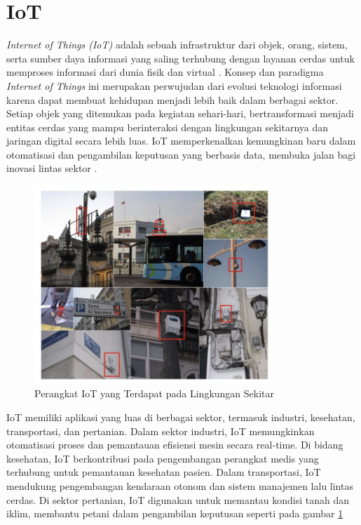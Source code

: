 \section{IoT}



\textit{Internet of Things (IoT)} adalah sebuah infrastruktur dari objek, orang, sistem, serta sumber daya informasi yang saling terhubung dengan layanan cerdas untuk memproses informasi dari dunia fisik dan virtual \parencite{Dias2019}. Konsep dan paradigma \textit{Internet of Things} ini merupakan perwujudan dari evolusi teknologi informasi karena dapat membuat kehidupan menjadi lebih baik dalam berbagai sektor. Setiap objek yang ditemukan pada kegiatan sehari-hari, bertransformasi menjadi entitas cerdas yang mampu berinteraksi dengan lingkungan sekitarnya dan jaringan digital secara lebih luas. IoT memperkenalkan kemungkinan baru dalam otomatisasi dan pengambilan keputusan yang berbasis data, membuka jalan bagi inovasi lintas sektor \parencite{madakam2015internet}.

\begin{figure}[ht]
  \centering
  \includegraphics[width=0.8\textwidth]{resources/chapter-2/gambar-iot.jpg}
  \caption{Perangkat IoT yang Terdapat pada Lingkungan Sekitar \parencite{sotres2017practical}}
  \label{fig:iot-kehidupan-sehari-hari}
\end{figure}

IoT memiliki aplikasi yang luas di berbagai sektor, termasuk industri, kesehatan, transportasi, dan pertanian. Dalam sektor industri, IoT memungkinkan otomatisasi proses dan pemantauan efisiensi mesin secara real-time. Di bidang kesehatan, IoT berkontribusi pada pengembangan perangkat medis yang terhubung untuk pemantauan kesehatan pasien. Dalam transportasi, IoT mendukung pengembangan kendaraan otonom dan sistem manajemen lalu lintas cerdas. Di sektor pertanian, IoT digunakan untuk memantau kondisi tanah dan iklim, membantu petani dalam pengambilan keputusan seperti pada gambar \ref{fig:iot-kehidupan-sehari-hari}

